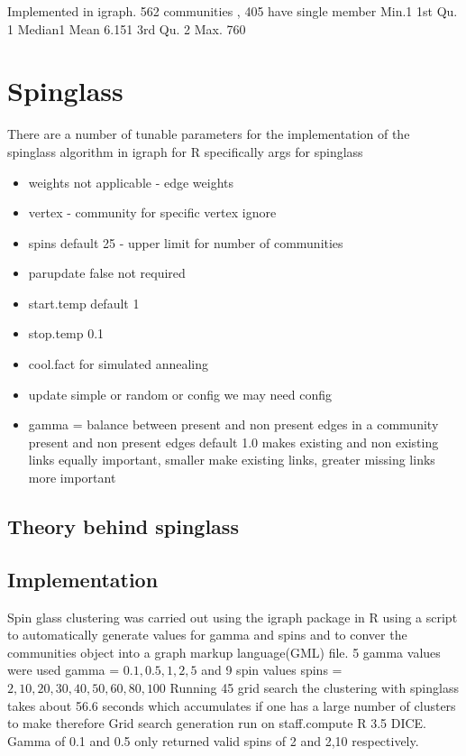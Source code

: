 Implemented in igraph. 562 communities , 405 have single member  Min.1 1st Qu.  1 Median1    Mean 6.151 3rd Qu. 2   Max. 760 
 
  
\section{Spinglass}

There are a number of tunable parameters for the implementation of the spinglass algorithm in igraph for R specifically
args for spinglass
\begin{itemize}
    \item{weights not applicable - edge weights}
    \item vertex - community for specific vertex ignore
    \item spins default 25 - upper limit for number of communities
    \item parupdate false not required
    \item start.temp default 1
    \item stop.temp 0.1
    \item cool.fact for simulated annealing
    \item update simple or random or config we may need config
    \item gamma = balance between present and non present edges in a community present and non present edges default 1.0 makes existing and non existing links equally important, smaller make existing links, greater missing links more important
\end{itemize}











\subsection{Theory behind spinglass}

\subsection{Implementation}
Spin glass clustering was carried out using the igraph package in R using a script to automatically generate values for gamma and spins and to conver the communities object into a graph markup language(GML) file. 5 gamma values were used gamma = $0.1,0.5,1,2,5$ and 9 spin values spins = $2,10,20,30,40,50,60,80,100$ 
Running 45 grid search the clustering with spinglass takes about 56.6 seconds which accumulates if one has a large number of clusters to make therefore Grid search generation run on staff.compute R 3.5 DICE.
Gamma of 0.1 and 0.5 only returned valid spins of 2 and 2,10 respectively. 
